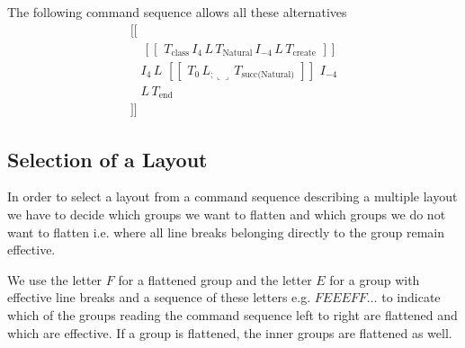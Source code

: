 \documentclass[12pt]{article}
\def\blank{\llcorner\!\!\lrcorner}
\def\class{\text{class}}
\def\create{\text{create}}
\def\kwend{\text{end}}
\def\GS{\,[\![\,}
\def\GE{\,]\!]\,}
\def\Natural{\text{Natural}}
\begin{document}
The following command sequence allows all these alternatives
$$
\begin{array}{l}
  \GS \, \\
  \quad \GS \, T_\class\,
     I_4\, L\, T_\Natural\, I_{-4}\,
  L\, T_\create\, \GE
  \\
  \quad I_4\, L\, \GS\,
  T_0\, L_{;\blank} \, T_\text{succ(Natural)}\,
  \GE\, I_{-4} \\
  \quad L \, T_\kwend \, \\
  \GE
\end{array}
$$



\subsection{Selection of a Layout}

In order to select a layout from a command sequence describing a multiple
layout we have to decide which groups we want to flatten and which groups we
do not want to flatten i.e. where all line breaks belonging directly to the
group remain effective.

We use the letter $F$ for a flattened group and the letter $E$ for a group
with effective line breaks and a sequence of these letters e.g. $FEEEFF\ldots$
to indicate which of the groups reading the command sequence left to right are
flattened and which are effective. If a group is flattened, the inner groups
are flattened as well.
\end{document}
